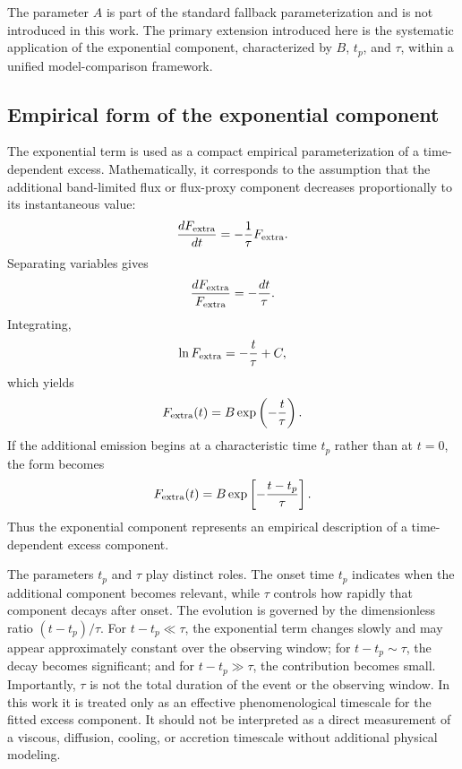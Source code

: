 \documentclass[11pt]{article}
\begin{document}
The parameter $A$ is part of the standard fallback parameterization and is not introduced in this work. The primary extension introduced here is the systematic application of the exponential component, characterized by $B$, $t_p$, and $\tau$, within a unified model-comparison framework.

\subsection{Empirical form of the exponential component}
The exponential term is used as a compact empirical parameterization of a time-dependent excess. Mathematically, it corresponds to the assumption that the additional band-limited flux or flux-proxy component decreases proportionally to its instantaneous value:
\begin{equation}
\frac{dF_{\rm extra}}{dt}=-\frac{1}{\tau}F_{\rm extra}.
\label{eq:dissipative}
\end{equation}
Separating variables gives
\begin{equation}
\frac{dF_{\rm extra}}{F_{\rm extra}}=-\frac{dt}{\tau}.
\end{equation}
Integrating,
\begin{equation}
\ln F_{\rm extra}=-\frac{t}{\tau}+C,
\end{equation}
which yields
\begin{equation}
F_{\rm extra}(t)=B\exp\left(-\frac{t}{\tau}\right).
\end{equation}
If the additional emission begins at a characteristic time $t_p$ rather than at $t=0$, the form becomes
\begin{equation}
F_{\rm extra}(t)=B\exp\left[-\frac{t-t_p}{\tau}\right].
\label{eq:extraexp}
\end{equation}
Thus the exponential component represents an empirical description of a time-dependent excess component.

The parameters $t_p$ and $\tau$ play distinct roles. The onset time $t_p$ indicates when the additional component becomes relevant, while $\tau$ controls how rapidly that component decays after onset. The evolution is governed by the dimensionless ratio $(t-t_p)/\tau$. For $t-t_p\ll\tau$, the exponential term changes slowly and may appear approximately constant over the observing window; for $t-t_p\sim\tau$, the decay becomes significant; and for $t-t_p\gg\tau$, the contribution becomes small. Importantly, $\tau$ is not the total duration of the event or the observing window. In this work it is treated only as an effective phenomenological timescale for the fitted excess component. It should not be interpreted as a direct measurement of a viscous, diffusion, cooling, or accretion timescale without additional physical modeling.
\end{document}
